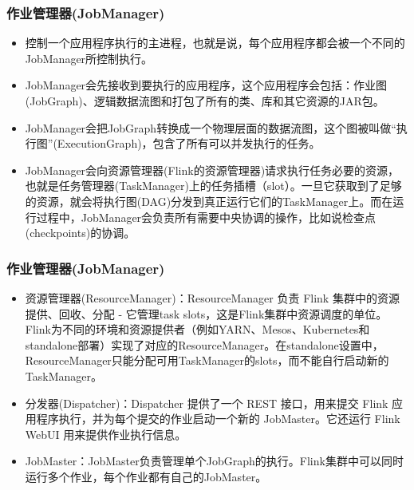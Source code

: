 \documentclass{beamer}
\begin{document}
  \begin{frame}
    \frametitle{作业管理器(JobManager)}

    \begin{itemize}
        \item 控制一个应用程序执行的主进程，也就是说，每个应用程序都会被一个不同的JobManager所控制执行。
        \item JobManager会先接收到要执行的应用程序，这个应用程序会包括：作业图(JobGraph)、逻辑数据流图和打包了所有的类、库和其它资源的JAR包。
        \item JobManager会把JobGraph转换成一个物理层面的数据流图，这个图被叫做“执行图”(ExecutionGraph)，包含了所有可以并发执行的任务。
        \item JobManager会向资源管理器(Flink的资源管理器)请求执行任务必要的资源，也就是任务管理器(TaskManager)上的任务插槽（slot）。一旦它获取到了足够的资源，就会将执行图(DAG)分发到真正运行它们的TaskManager上。而在运行过程中，JobManager会负责所有需要中央协调的操作，比如说检查点(checkpoints)的协调。
    \end{itemize}
  
  \end{frame}

  \begin{frame}
    \frametitle{作业管理器(JobManager)}

    \begin{itemize}
        \item 资源管理器(ResourceManager)：ResourceManager 负责 Flink 集群中的资源提供、回收、分配 - 它管理task slots，这是Flink集群中资源调度的单位。Flink为不同的环境和资源提供者（例如YARN、Mesos、Kubernetes和standalone部署）实现了对应的ResourceManager。在standalone设置中，ResourceManager只能分配可用TaskManager的slots，而不能自行启动新的TaskManager。
        \item 分发器(Dispatcher)：Dispatcher 提供了一个 REST 接口，用来提交 Flink 应用程序执行，并为每个提交的作业启动一个新的 JobMaster。它还运行 Flink WebUI 用来提供作业执行信息。
        \item JobMaster：JobMaster负责管理单个JobGraph的执行。Flink集群中可以同时运行多个作业，每个作业都有自己的JobMaster。
    \end{itemize}
  
  \end{frame}
\end{document}
